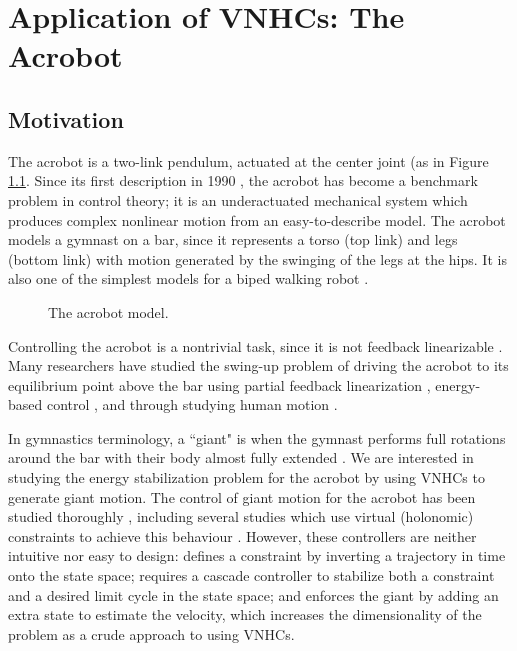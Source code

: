 

\chapter{Application of VNHCs: The Acrobot}\label{ch:acrobot}
\section{Motivation}
The acrobot is a two-link pendulum, actuated at the center joint (as in Figure
\ref{fig:acrobot-model}. Since its first description in 1990 
\cite{nonlinear_controllers_nonintegrable_acrobot}, the
acrobot has become a benchmark problem in control theory; it is an
underactuated mechanical system which produces
complex nonlinear motion from an easy-to-describe model.
The acrobot models a gymnast on a bar,
since it represents a torso (top link) and legs (bottom link) with motion
generated by the swinging of the legs at the hips. It is also one of the
simplest models for a biped walking robot
\cite{toward_framework_biped_locomotion}.

\begin{figure}
    \centering
    
    \caption{The acrobot model.}%
    \label{fig:acrobot-model}
\end{figure}

Controlling the acrobot is a nontrivial task, since it is not feedback
linearizable \cite{nonlinear_controllers_nonintegrable_acrobot}. Many
researchers have studied the swing-up problem of driving the acrobot to its
equilibrium point above the bar using partial feedback linearization
\cite{swingup_problem_acrobot}, energy-based control
\cite{swingup_acrobot_pendulum, swingup_acrobot_energy}, and through studying
human motion \cite{swingup_giant_acrobot, motion_control_gymnastic_skill}.

In gymnastics terminology, a ``giant" is when the gymnast performs full
rotations around the bar with their body almost fully extended
\cite{usagym_giant}. We are interested in studying the energy stabilization
problem for the acrobot by using VNHCs to generate giant motion. The control of
giant motion for the acrobot has been studied thoroughly 
\cite{energy_pumping_robotic_swinging, swingup_giant_acrobot,
control_giant_two_link_gymnastic_robot}, including several studies which use
virtual (holonomic) constraints to achieve this behaviour
\cite{dynamical_servo_acrobot_vc, control_giant_two_link_gymnastic_robot,
xingbo_thesis}. However, these controllers are neither intuitive nor easy to design:
\cite{control_giant_two_link_gymnastic_robot} defines a constraint by inverting
a trajectory in time onto the state space; \cite{dynamical_servo_acrobot_vc}
requires a cascade controller to stabilize both a constraint and a desired limit
cycle in the state space; and \cite{xingbo_thesis} enforces the giant by adding
an extra state to estimate the velocity, which increases the dimensionality of
the problem as a crude approach to using VNHCs.


